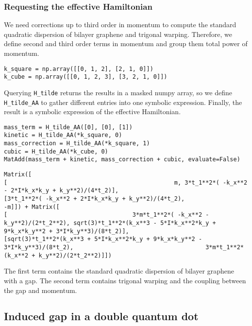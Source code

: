 \documentclass[submission, Codebases]{SciPost}
\begin{document}
{{\subsubsection{Requesting the effective Hamiltonian}

We need corrections up to third order in momentum to compute the standard
quadratic dispersion of bilayer graphene and trigonal warping.
Therefore, we define second and third order terms in momentum and group them
total power of momentum.

\begin{verbatim}
k_square = np.array([[0, 1, 2], [2, 1, 0]])
k_cube = np.array([[0, 1, 2, 3], [3, 2, 1, 0]])
\end{verbatim}

Querying \texttt{H\_tilde} returns the results in a masked numpy array, so we
define \texttt{H\_tilde\_AA} to gather different entries into one symbolic expression.
Finally, the result is a symbolic expression of the effective Hamiltonian.

\begin{verbatim}
mass_term = H_tilde_AA([0], [0], [1])
kinetic = H_tilde_AA(*k_square, 0)
mass_correction = H_tilde_AA(*k_square, 1)
cubic = H_tilde_AA(*k_cube, 0)
MatAdd(mass_term + kinetic, mass_correction + cubic, evaluate=False)
\end{verbatim}

\begin{verbatim}
Matrix([
[                                                m, 3*t_1**2*( -k_x**2 - 2*I*k_x*k_y + k_y**2)/(4*t_2)],
[3*t_1**2*( -k_x**2 + 2*I*k_x*k_y + k_y**2)/(4*t_2),                                                -m]]) + Matrix([
[                                    3*m*t_1**2*( -k_x**2 - k_y**2)/(2*t_2**2), sqrt(3)*t_1**2*(k_x**3 - 5*I*k_x**2*k_y + 9*k_x*k_y**2 + 3*I*k_y**3)/(8*t_2)],
[sqrt(3)*t_1**2*(k_x**3 + 5*I*k_x**2*k_y + 9*k_x*k_y**2 - 3*I*k_y**3)/(8*t_2),                                      3*m*t_1**2*(k_x**2 + k_y**2)/(2*t_2**2)]])
\end{verbatim}

The first term contains the standard quadratic dispersion of bilayer graphene
with a gap.
The second term contains trigonal warping and the coupling between the gap and
momentum.

\subsection{Induced gap in a double quantum dot}

}}
\end{document}
